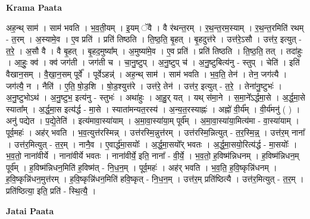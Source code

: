 \documentclass[17pt]{extarticle}
\begin{document}
\textbf{Krama Paata} \newline

अह॒न्थ् साम॑ । साम॑ भवति । भ॒व॒ती॒यम् । इ॒यम् ॅवै । वै र॑थन्त॒रम् । र॒थ॒न्त॒रम॒स्याम् । र॒थ॒न्त॒रमिति॑ रथम् - त॒रम् । अ॒स्यामे॒व । ए॒व प्रति॑ । प्रति॑ तिष्ठति । ति॒ष्ठ॒ति॒ बृ॒हत् । बृ॒हदुत्त॑रे । उत्त॑रे॒ऽसौ । उत्त॑र॒ इत्युत् - त॒रे॒ । अ॒सौ वै । वै बृ॒हत् । बृ॒हद॒मुष्या᳚म् । अ॒मुष्या॑मे॒व । ए॒व प्रति॑ । प्रति॑ तिष्ठति । ति॒ष्ठ॒ति॒ तत् । तदा॑हुः । आ॒हुः॒ क्व॑ । क्व॑ जग॑ती । जग॑ती च । चा॒नु॒ष्टुप् । अ॒नु॒ष्टुप् च॑ । अ॒नु॒ष्टुबित्य॑नु - स्तुप् । चेति॑ । इति॑ वैखान॒सम् । वै॒खा॒न॒सम् पूर्वे᳚ । पूर्वेऽहन्न्॑ । अह॒न्थ् साम॑ । साम॑ भवति । भ॒व॒ति॒ तेन॑ । तेन॒ जग॑त्यै । जग॑त्यै॒ न । नैति॑ । ए॒ति॒ षो॒ड॒शि । षो॒ड॒श्युत्त॑रे । उत्त॑रे॒ तेन॑ । उत्त॑र॒ इत्युत् - त॒रे॒ । तेना॑नु॒ष्टुभः॑ । अ॒नु॒ष्टुभोऽथ॑ । अ॒नु॒ष्टुभ॒ इत्य॑नु - स्तुभः॑ । अथा॑हुः । आ॒हु॒र् यत् । यथ् स॑मा॒ने । स॒मा॒ने᳚ऽर्द्धमा॒से । अ॒र्द्ध॒मा॒से स्याता᳚म् । अ॒र्द्ध॒मा॒स इत्य॑र्द्ध - मा॒से । स्याता॑मन्यत॒रस्य॑ । अ॒न्य॒त॒रस्याह्नः॑ । अह्नो॑ वी॒र्य᳚म् । वी॒र्य॑मनु॑ ( ) । अनु॑ पद्येत । प॒द्ये॒तेति॑ । इत्य॑मावा॒स्या॑याम् । अ॒मा॒वा॒स्या॑या॒म् पूर्व᳚म् । अ॒मा॒वा॒स्या॑या॒मित्य॑मा - वा॒स्या॑याम् । पूर्व॒महः॑ । अह॑र् भवति । भ॒व॒त्युत्त॑रस्मिन्न् । उत्त॑रस्मि॒न्नुत्त॑रम् । उत्त॑रस्मि॒न्नित्युत् - त॒र॒स्मि॒न्न्॒ । उत्त॑र॒म् नाना᳚ । उत्त॑र॒मित्युत् - त॒र॒म् । नानै॒व । ए॒वार्द्ध॑मा॒सयोः᳚ । अ॒र्द्ध॒मा॒सयो᳚र् भवतः । अ॒र्द्ध॒मा॒सयो॒रित्य॑र्द्ध - मा॒सयोः᳚ । भ॒व॒तो॒ नाना॑वीर्ये । नाना॑वीर्ये भवतः । नाना॑वीर्ये॒ इति॒ नाना᳚ - वी॒र्ये॒ । भ॒व॒तो॒ ह॒विष्म॑न्निधनम् । ह॒विष्म॑न्निधन॒म् पूर्व᳚म् । ह॒विष्म॑न्निधन॒मिति॑ ह॒विष्म॑त् - नि॒ध॒न॒म् । पूर्व॒महः॑ । अह॑र् भवति । भ॒व॒ति॒ ह॒वि॒ष्कृन्नि॑धनम् । ह॒वि॒ष्कृन्नि॑धन॒मुत्त॑रम् । ह॒वि॒ष्कृन्नि॑धन॒मिति॑ हवि॒ष्कृत् - नि॒ध॒न॒म् । उत्त॑र॒म् प्रति॑ष्ठित्यै । उत्त॑र॒मित्युत् - त॒र॒म् । प्रति॑ष्ठित्या॒ इति॒ प्रति॑ - स्थि॒त्यै॒ । \newline

\textbf{Jatai Paata} \newline
\end{document}
